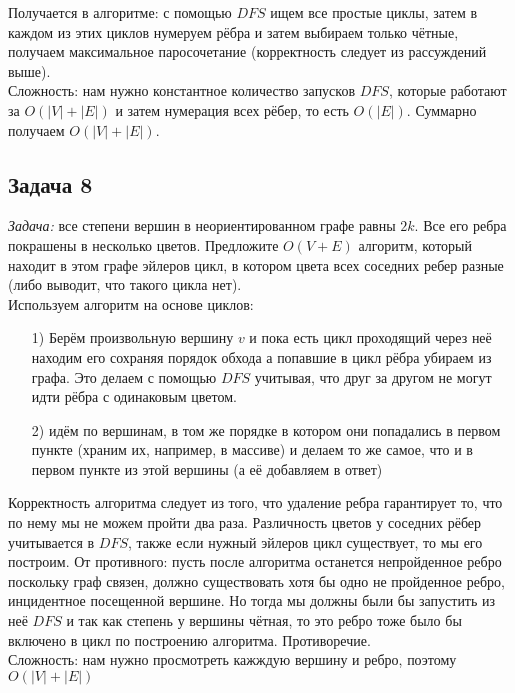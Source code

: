 \documentclass[a4paper,12pt]{article} %
\begin{document}
Получается в алгоритме: с помощью $ DFS $ ищем все простые циклы, затем в каждом из этих циклов нумеруем рёбра и затем выбираем только чётные, получаем максимальное паросочетание (корректность следует из рассуждений выше).\\

Сложность: нам нужно константное количество запусков $ DFS $, которые работают за $ O(|V| +|E|) $ и затем нумерация всех рёбер, то есть $ O(|E|) $. Суммарно получаем $ O(|V| +|E|) $.

\subsection*{Задача 8}
\textit{Задача:} все степени вершин в неориентированном графе равны $2k$. Все его ребра покрашены в несколько цветов. Предложите $O(V+E)$ алгоритм, который находит в этом графе эйлеров цикл, в котором цвета всех соседних ребер разные (либо выводит, что такого цикла нет).\\

Используем алгоритм на основе циклов:
\begin{itemize}
\item[1) ] Берём произвольную вершину $ v $ и пока есть цикл проходящий через неё находим его сохраняя порядок обхода а попавшие в цикл рёбра убираем из графа. Это делаем с помощью $ DFS $ учитывая, что друг за другом не могут идти рёбра с одинаковым цветом.
\item[2) ] идём по вершинам, в том же порядке в котором они попадались в первом пункте (храним их, например, в массиве) и делаем то же самое, что и в первом пункте из этой вершины (а её добавляем в ответ)  
\end{itemize}

Корректность алгоритма следует из того, что удаление ребра гарантирует то, что по нему мы не можем пройти два раза. Различность цветов у соседних рёбер учитывается в $ DFS $, также если нужный эйлеров цикл существует, то мы его построим. От противного: пусть после алгоритма останется непройденное ребро   поскольку граф связен, должно существовать хотя бы одно не пройденное ребро, инцидентное посещенной вершине. Но тогда мы должны были бы запустить из неё $ DFS $ и так как степень у вершины чётная, то это ребро тоже было бы включено в цикл по построению алгоритма. Противоречие.\\

Сложность: нам нужно просмотреть кажждую вершину и ребро, поэтому $ O(|V| +|E|) $
\end{document}
